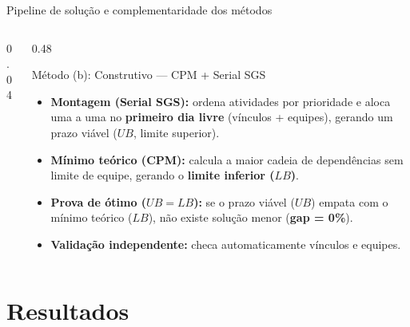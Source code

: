 \documentclass[aspectratio=169]{beamer}
\begin{document}
\begin{frame}{Pipeline de solução e complementaridade dos métodos}
\begin{columns}[T,onlytextwidth]
\begin{column}{0.04\textwidth}\end{column}

\begin{column}{0.48\textwidth}
\begin{block}{Método (b): Construtivo --- CPM + Serial SGS}
\fontsize{6.8pt}{8.2pt}\selectfont
\begin{itemize}
    \setlength{\itemsep}{0.05cm}
    \item \textbf{Montagem (Serial SGS):} ordena atividades por prioridade e aloca uma a uma no \textbf{primeiro dia livre} (vínculos + equipes), gerando um prazo viável (\textbf{$UB$}, limite superior).
    \item \textbf{Mínimo teórico (CPM):} calcula a maior cadeia de dependências sem limite de equipe, gerando o \textbf{limite inferior ($LB$)}.
    \item \textbf{Prova de ótimo ($UB = LB$):} se o prazo viável ($UB$) empata com o mínimo teórico ($LB$), não existe solução menor (\textbf{gap = 0\%}).
    \item \textbf{Validação independente:} checa automaticamente vínculos e equipes.
\end{itemize}
\end{block}
\end{column}

\end{columns}

\end{frame}

\section{Resultados}
\end{document}
